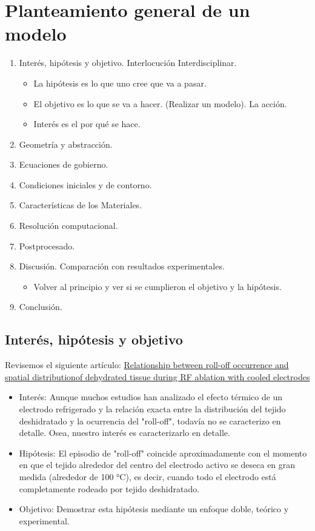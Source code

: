 \section{Planteamiento general de un modelo}
\begin{enumerate}
    \item Interés, hipótesis y objetivo. Interlocución Interdisciplinar.
	\begin{itemize}
	    \item La hipótesis es lo que uno cree que va a pasar.
	    \item El objetivo es lo que se va a hacer. (Realizar un modelo). La acción. 
	    \item Interés es el por qué se hace.
	\end{itemize}
    \item Geometría y abstracción.
    \item Ecuaciones de gobierno.
    \item Condiciones iniciales y de contorno.
    \item Características de los Materiales.
    \item Resolución computacional.
    \item Postprocesado.
    \item Discusión. Comparación con resultados experimentales.
	\begin{itemize}
	    \item Volver al principio y ver si se cumplieron el objetivo y la hipótesis.
	\end{itemize}
    \item Conclusión.
\end{enumerate}

\subsection{Interés, hipótesis y objetivo}
Revisemos el siguiente artículo: \href{https://doi.org/10.3109/02656736.2011.631076}{Relationship between roll-off occurrence and spatial distributionof dehydrated tissue during RF ablation with cooled electrodes}

\begin{itemize}
	\item Interés: Aunque muchos estudios han analizado el efecto térmico de un electrodo refrigerado y la relación exacta entre la distribución del tejido deshidratado y la ocurrencia del "roll-off", todavía no se caracterizo en detalle. Osea, nuestro interés es caracterizarlo en detalle.
	\item Hipótesis: El episodio de "roll-off" coincide aproximadamente con el momento en que el tejido alrededor del centro del electrodo activo se deseca en gran medida (alrededor de 100 °C), es decir, cuando todo el electrodo está completamente rodeado por tejido deshidratado.
	\item Objetivo: Demostrar esta hipótesis mediante un enfoque doble, teórico y experimental.
\end{itemize}

